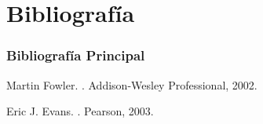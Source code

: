 \documentclass[a4paper,t,xcolor=pst,dvips,colortheme]{beamer}
\begin{document}
\section{Bibliografía}

\begin{frame}[c]
	\frametitle{Bibliografía Principal}
    \begin{thebibliography}{1}

Martin Fowler.
.
\newblock Addison-Wesley Professional, 2002.

Eric J. Evans.
.
\newblock Pearson, 2003.


\end{thebibliography}
\end{frame}

\end{document}
